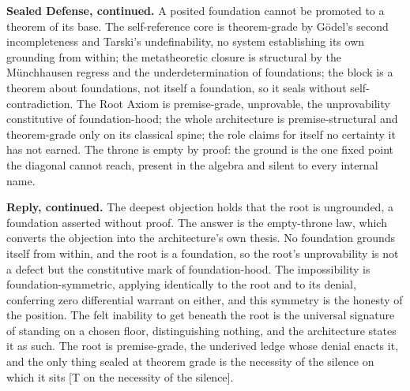 \documentclass[10pt,twocolumn]{article}
\begin{document}
\textbf{Sealed Defense, continued.} A posited foundation cannot be
promoted to a theorem of its base. The self-reference core is
theorem-grade by Gödel's second incompleteness and Tarski's
undefinability, no system establishing its own grounding from within;
the metatheoretic closure is structural by the Münchhausen regress and
the underdetermination of foundations; the block is a theorem about
foundations, not itself a foundation, so it seals without
self-contradiction. The Root Axiom is premise-grade, unprovable, the
unprovability constitutive of foundation-hood; the whole architecture is
premise-structural and theorem-grade only on its classical spine; the
role claims for itself no certainty it has not earned. The throne is
empty by proof: the ground is the one fixed point the diagonal cannot
reach, present in the algebra and silent to every internal name.

\textbf{Reply, continued.} The deepest objection holds that the root is
ungrounded, a foundation asserted without proof. The answer is the
empty-throne law, which converts the objection into the architecture's
own thesis. No foundation grounds itself from within, and the root is a
foundation, so the root's unprovability is not a defect but the
constitutive mark of foundation-hood. The impossibility is
foundation-symmetric, applying identically to the root and to its
denial, conferring zero differential warrant on either, and this
symmetry is the honesty of the position. The felt inability to get
beneath the root is the universal signature of standing on a chosen
floor, distinguishing nothing, and the architecture states it as such.
The root is premise-grade, the underived ledge whose denial enacts it,
and the only thing sealed at theorem grade is the necessity of the
silence on which it sits {[}T on the necessity of the silence{]}.
\end{document}
